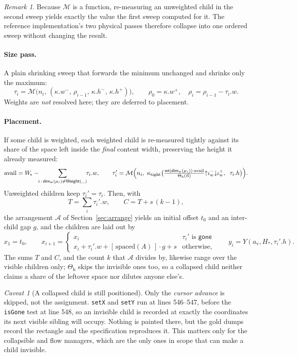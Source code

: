 \documentclass[11pt,a4paper]{article}
\newcommand{\Weight}{\mathsf{Weight}}
\newcommand{\gone}{\mathsf{gone}}
\newcommand{\Mm}{\mathcal{M}}          %
\newcommand{\Aa}{\mathcal{A}}          %
\newcommand{\Iw}{\iota_{\mathrm{w}}}
\newcommand{\Dimw}{\mathsf{dim}_{\mathrm{w}}}
\newcommand{\wt}{\mathsf{wt}}
\newcommand{\clampL}{\mathord{\uparrow}}
\newcommand{\clampH}{\mathord{\downarrow}}
\newcommand{\jv}[1]{\texttt{#1}}       %
\theoremstyle{definition}
\theoremstyle{plain}
\theoremstyle{remark}
\newtheorem*{remark}{Remark}
\newtheorem{warning}{Caveat}[section]
\begin{document}
\begin{remark}
Because $\Mm$ is a function, re-measuring an unweighted child in the second
sweep yields exactly the value the first sweep computed for it. The reference
implementation's two physical passes therefore collapse into one ordered sweep
without changing the result.
\end{remark}

\paragraph{Size pass.}
A plain shrinking sweep that forwards the minimum unchanged and shrinks only the
maximum:
\[
  \tau_i = \Mm\bigl(n_i,\, (\kappa.w^-,\, \rho_{i-1},\, \kappa.h^-,\, \kappa.h^+)\bigr),
  \qquad \rho_0 = \kappa.w^+, \quad \rho_i = \rho_{i-1} - \tau_i.w .
\]
Weights are \emph{not} resolved here; they are deferred to placement.

\paragraph{Placement.}
If some child is weighted, each weighted child is re-measured tightly against
its share of the space left inside the \emph{final} content width, preserving
the height it already measured:
\[
  \mathrm{avail} = W_{\!*} - \!\!\sum_{i \,:\, \Dimw(\mu_i) \neq \Weight(\_)}\!\! \tau_i.w,
  \qquad
  \tau_i' = \Mm\Bigl(n_i,\; \kappa_{\mathrm{tight}}\bigl(
      \tfrac{\wt(\Dimw(\mu_i)) \cdot \mathrm{avail}}{\Theta_{\mathrm{h}}(\vec{n})}
      \clampL \Iw^- \clampH \Iw^+ ,\;\; \tau_i.h \bigr)\Bigr).
\]
Unweighted children keep $\tau_i' = \tau_i$. Then, with
\[
  T = \sum_i \tau_i'.w, \qquad
  C = T + s\,(k-1),
\]
the arrangement $\Aa$ of Section~\ref{sec:arrange} yields an initial offset
$t_0$ and an inter-child gap $g$, and the children are laid out by
\[
  x_1 = t_0, \qquad
  x_{i+1} = \begin{cases}
    x_i & \tau_i' \text{ is } \gone \\
    x_i + \tau_i'.w + [\,\mathrm{spaced}(A)\,]\cdot g + s & \text{otherwise,}
  \end{cases}
  \qquad
  y_i = Y(a_{\mathrm{v}}, H_{\!*}, \tau_i'.h).
\]
The sums $T$ and $C$, and the count $k$ that $\Aa$ divides by, likewise range
over the visible children only; $\Theta_{\mathrm{h}}$ skips the invisible ones
too, so a collapsed child neither claims a share of the leftover space nor
dilutes anyone else's.

\begin{warning}[A collapsed child is still positioned]
\label{sec:goneplaced}
Only the \emph{cursor advance} is skipped, not the assignment. \jv{setX} and
\jv{setY} run at lines 546--547, before the \jv{isGone} test at line 548, so an
invisible child is recorded at exactly the coordinates its next visible sibling
will occupy. Nothing is painted there, but the gold dumps record the rectangle
and the specification reproduces it. This matters only for the collapsible and
flow managers, which are the only ones in scope that can make a child invisible.
\end{warning}
\end{document}
